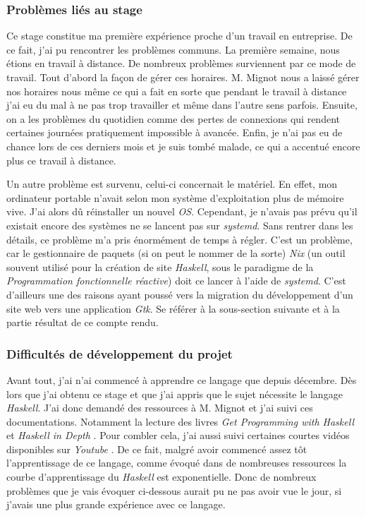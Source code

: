 \subsubsection{Problèmes liés au stage}

Ce stage constitue ma première expérience proche d'un travail en entreprise. De 
ce fait, j'ai pu rencontrer les problèmes communs. La première semaine, nous 
étions en travail à distance.
De nombreux problèmes surviennent par ce mode de travail. Tout d'abord la façon 
de gérer ces horaires. M. Mignot nous a laissé gérer nos horaires nous même ce 
qui a fait en sorte que pendant le travail à distance j'ai eu du mal à ne pas 
trop travailler et même dans l'autre sens parfois. Ensuite, on a les problèmes 
du quotidien comme des pertes de connexions qui rendent certaines journées
pratiquement impossible à avancée. Enfin, je n'ai pas eu de chance lors de ces 
derniers mois et je suis tombé malade, ce qui a accentué encore plus ce 
travail à distance.

\newpage

Un autre problème est survenu, celui-ci concernait le matériel. En effet, mon 
ordinateur portable n'avait selon mon système d'exploitation plus de mémoire 
vive. J'ai alors dû réinstaller un nouvel \textit{OS}. Cependant, je n'avais pas
prévu qu'il existait encore des systèmes ne se lancent pas sur \textit{systemd}. 
Sans rentrer dans les détails, ce problème m'a pris énormément 
de temps à régler. C'est un problème, car le gestionnaire de paquets (si on peut 
le nommer de la sorte) \textit{Nix} (un outil souvent utilisé pour la 
création de site \textit{Haskell}, sous le paradigme de la 
\textit{Programmation fonctionnelle réactive}) doit ce lancer à l'aide de 
\textit{systemd}. C'est d'ailleurs une des raisons ayant poussé vers la 
migration du développement d'un site web vers une application \textit{Gtk}. Se 
référer à la sous-section suivante et à la partie résultat de ce compte rendu. 

\subsubsection{Difficultés de développement du projet}

Avant tout, j'ai n'ai commencé à apprendre ce langage que depuis décembre. 
Dès lors que j'ai obtenu ce stage et que j'ai appris que le sujet nécessite le 
langage \textit{Haskell}. J'ai donc demandé des ressources à M. Mignot et j'ai 
suivi ces documentations. Notamment la lecture des livres 
\textit{Get Programming with Haskell} et \textit{Haskell in Depth}
\cite{bookWithHaskell, haskellInDepth}. Pour combler cela, j'ai aussi suivi 
certaines courtes vidéos disponibles sur \textit{Youtube}
\cite{playHaksell1, playHaksell2}. De ce fait, malgré avoir commencé assez 
tôt l'apprentissage de ce langage, comme évoqué dans de nombreuses ressources la 
courbe d'apprentissage du \textit{Haskell} est exponentielle. Donc de nombreux 
problèmes que je vais évoquer ci-dessous aurait pu ne pas avoir vue le jour, si 
j'avais une plus grande expérience avec ce langage.

